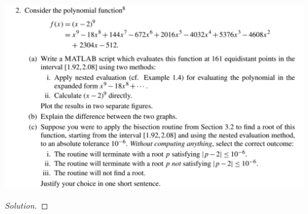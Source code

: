 \documentclass[12pt]{scrartcl}
\begin{document}
\newpage 

\includegraphics[width=14cm]{2.png}

\begin{proof}[Solution]

\end{proof}
\end{document}
